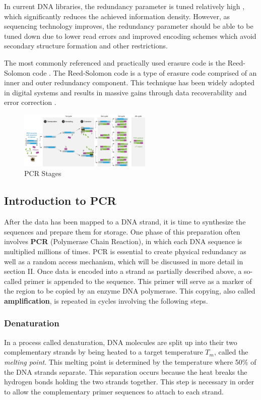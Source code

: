 \documentclass[a4paper,conference]{IEEEtran}
\begin{document}
In current DNA libraries, the redundancy parameter is tuned relatively high \cite{pcrbased}, which significantly reduces the achieved information density. However, as sequencing technology improves, the redundancy parameter should be able to be tuned down \cite{pcrbased} due to lower read errors and improved encoding schemes which avoid secondary structure formation and other restrictions.

The most commonly referenced and practically used erasure code is the Reed-Solomon code \cite{reedsolomoncodes}. The Reed-Solomon code is a type of erasure code comprised of an inner and outer redundancy component. This technique has been widely adopted in digital systems and results in massive gains through data recoverability and error correction \cite{}.



\begin{figure}[!t]
\centering
\includegraphics[width=2.5in]{pcr}
\caption{PCR Stages}
\label{fig_sim}
\end{figure}

\subsection{Introduction to PCR}

After the data has been mapped to a DNA strand, it is time to synthesize the sequences and prepare them for storage. One phase of this preparation often involves \textbf{PCR} (Polymerase Chain Reaction), in which each DNA sequence is multiplied millions of times. PCR is essential to create physical redundancy as well as a random access mechanism, which will be discussed in more detail in section II. Once data is encoded into a strand as partially described above, a so-called primer is appended to the sequence. This primer will serve as a marker of the region to be copied by an enzyme DNA polymerase. This copying, also called \textbf{amplification}, is repeated in cycles involving the following steps. \\

\subsubsection{Denaturation}
In a process called denaturation, DNA molecules are split up into their two complementary strands by being heated to a target temperature $T_m$, called the \textit{melting point}. This melting point is determined by the temperature where 50\% of the DNA strands separate. This separation occurs because the heat breaks the hydrogen bonds holding the two strands together. This step is necessary in order to allow the complementary primer sequences to attach to each strand.
\end{document}
